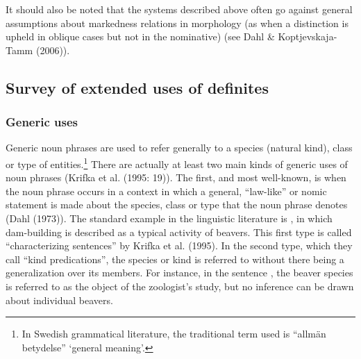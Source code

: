 It should also be noted that the systems described above often go against general assumptions about markedness relations in morphology (as when a distinction is upheld in oblique cases but not in the nominative) (see Dahl \& Koptjevskaja-Tamm (2006)).

\subsection[Survey of extended uses of definites]{\rmfamily Survey of extended uses of definites}
\label{bkm:Ref105226591}\subsubsection[Generic uses]{\rmfamily Generic uses}
\label{bkm:Ref154983693}%
Generic noun phrases are used to refer generally to a species (natural kind), class or type of entities.\footnote{ In Swedish grammatical literature, the traditional term used is “allmän betydelse” ‘general meaning’.} There are actually at least two main kinds of generic uses of noun phrases (Krifka et al. (1995: 19)). The first, and most well-known, is when the noun phrase occurs in a context in which a general, “law-like” or nomic statement is made about the species, class or type that the noun phrase denotes (Dahl (1973)). The\textbf{ }standard example in the linguistic literature is , in which dam-building is described as a typical activity of beavers. This first type is called “characterizing sentences” by Krifka et al. (1995). In the second type, which they call “kind predications”, the species or kind is referred to without there being a generalization over its members. For instance, in the sentence , the beaver species is referred to as the object of the zoologist’s study, but no inference can be drawn about individual beavers.

